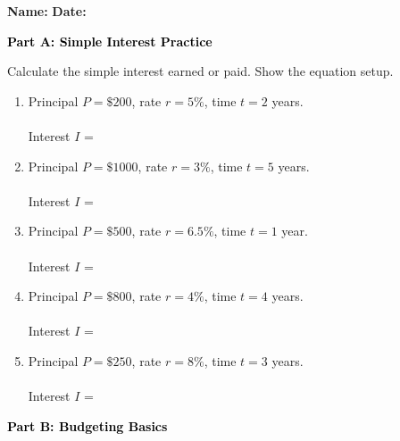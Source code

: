 \documentclass[12pt, letterpaper, fleqn]{article}
\newcommand{\blanklong}{\underline{\hspace{6.5cm}}}
\begin{document}
\textbf{Name:} \underline{\hspace{5cm}}
\hfill
\textbf{Date:} \underline{\hspace{3cm}}\\

\begin{tcolorbox}[colback=black!10]
    \large\textcolor{black}{\textbf{Part A: Simple Interest Practice}}
\end{tcolorbox}

\vspace{3mm}

\noindent
Calculate the simple interest earned or paid. Show the equation setup.

\vspace{5mm}

\begin{enumerate}[itemsep=1.7cm, leftmargin=0.6cm]
\item Principal $P = \$200$, rate $r = 5\%$, time $t = 2$ years. \\ \\
Interest $I$ = \blanklong

\item Principal $P = \$1000$, rate $r = 3\%$, time $t = 5$ years. \\ \\
Interest $I$ = \blanklong

\item Principal $P = \$500$, rate $r = 6.5\%$, time $t = 1$ year. \\ \\
Interest $I$ = \blanklong

\item Principal $P = \$800$, rate $r = 4\%$, time $t = 4$ years. \\ \\
Interest $I$ = \blanklong

\item Principal $P = \$250$, rate $r = 8\%$, time $t = 3$ years. \\ \\
Interest $I$ = \blanklong
\end{enumerate}

\newpage

\begin{tcolorbox}[colback=black!10]
    \large\textcolor{black}{\textbf{Part B: Budgeting Basics}}
\end{tcolorbox}
\end{document}
